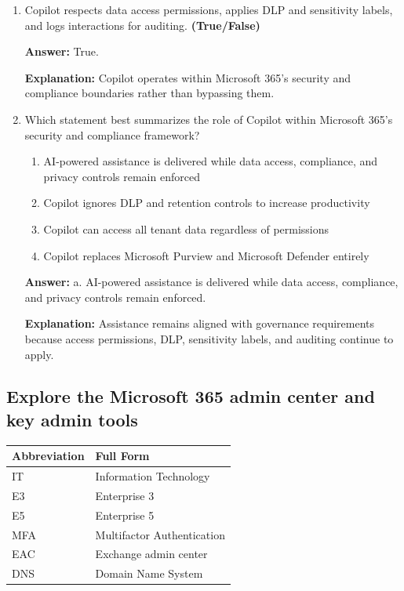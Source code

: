 \documentclass[10pt]{article}
\begin{document}
\begin{enumerate}[leftmargin=*]
\item Copilot respects data access permissions, applies DLP and sensitivity labels, and logs interactions for auditing. \textbf{(True/False)}

\textbf{Answer:} True.

\textbf{Explanation:} Copilot operates within Microsoft 365’s security and compliance boundaries rather than bypassing them.

\item Which statement best summarizes the role of Copilot within Microsoft 365’s security and compliance framework?
\begin{enumerate}[label=\alph*., leftmargin=1.5em]
\item AI-powered assistance is delivered while data access, compliance, and privacy controls remain enforced
\item Copilot ignores DLP and retention controls to increase productivity
\item Copilot can access all tenant data regardless of permissions
\item Copilot replaces Microsoft Purview and Microsoft Defender entirely
\end{enumerate}
\textbf{Answer:} a. AI-powered assistance is delivered while data access, compliance, and privacy controls remain enforced.

\textbf{Explanation:} Assistance remains aligned with governance requirements because access permissions, DLP, sensitivity labels, and auditing continue to apply.

\end{enumerate}

\clearpage
\subsection{Explore the Microsoft 365 admin center and key admin tools}

\begin{center}
\begin{tabular}{>{\raggedright\arraybackslash}p{} >{\raggedright\arraybackslash}p{}}
\toprule
\textbf{Abbreviation} & \textbf{Full Form} \\
\midrule
IT & Information Technology \\
E3 & Enterprise 3 \\
E5 & Enterprise 5 \\
MFA & Multifactor Authentication \\
EAC & Exchange admin center \\
DNS & Domain Name System \\
\bottomrule
\end{tabular}
\end{center}
\end{document}
